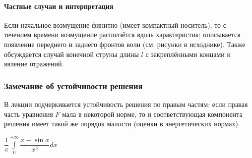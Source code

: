 \documentclass[12pt,a4paper]{article}
\newcommand{\qheading}[1]{\paragraph{#1}}
\theoremstyle{definition}
\theoremstyle{plain}
\theoremstyle{remark}
\numberwithin{equation}{subsubsection}
\begin{document}
	\qheading{Частные случаи и интерпретация}
	Если начальное возмущение финитно (имеет компактный носитель), то с течением времени возмущение расползётся вдоль характеристик; описывается появление переднего и заднего фронтов волн (см. рисунки в исходнике). Также обсуждается случай конечной струны длины \(l\) с закреплёнными концами и явление отражений.
	
	\subsubsection{Замечание об устойчивости решения}
	В лекции подчеркивается устойчивость решения по правым частям: если правая часть уравнения \(F\) мала в некоторой норме, то и соответствующая компонента решения имеет такой же порядок малости (оценки в энергетических нормах).
	
	\vspace{1em}
	
	$\dfrac{1}{\pi} \displaystyle\int\limits_{0}^{+\infty} \dfrac{x - \sin x}{x^3} dx$
	
\end{document}
